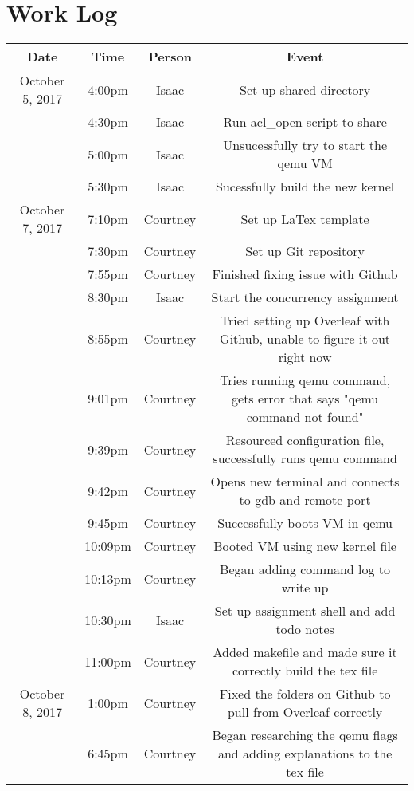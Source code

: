\documentclass[letterpaper,10pt,draftclsnofoot,onecolumn,titlepage]{IEEEtran}
\begin{document}
\section{Work Log}
\begin{center}
\begin{tabular}{ c c c c }
 Date  & Time & Person & Event \\ \hline
 October 5, 2017 & 4:00pm & Isaac & Set up shared directory \\
                 & 4:30pm & Isaac & Run acl\_open script to share \\
                 & 5:00pm & Isaac & Unsucessfully try to start the qemu VM \\
                 & 5:30pm & Isaac & Sucessfully build the new kernel \\ \hline
 October 7, 2017 & 7:10pm & Courtney & Set up LaTex template \\  
 		 & 7:30pm & Courtney & Set up Git repository \\
                 & 7:55pm & Courtney & Finished fixing issue with Github \\
                 & 8:30pm & Isaac & Start the concurrency assignment \\
		 & 8:55pm & Courtney & Tried setting up Overleaf with Github, unable to figure it out right now \\
                 & 9:01pm & Courtney & Tries running qemu command, gets error that says "qemu command not found" \\
                 & 9:39pm & Courtney & Resourced configuration file, successfully runs qemu command \\
                 & 9:42pm & Courtney & Opens new terminal and connects to gdb and remote port \\
                 & 9:45pm & Courtney & Successfully boots VM in qemu \\
                 & 10:09pm & Courtney & Booted VM using new kernel file \\
                 & 10:13pm & Courtney & Began adding command log to write up\\
		 & 10:30pm & Isaac & Set up assignment shell and add todo notes \\
                 & 11:00pm & Courtney & Added makefile and made sure it correctly build the tex file \\ \hline
 October 8, 2017 & 1:00pm & Courtney & Fixed the folders on Github to pull from Overleaf correctly \\
 		 & 6:45pm & Courtney & Began researching the qemu flags and adding explanations to the tex file \\

\end{tabular}
\end{center}
\end{document}
